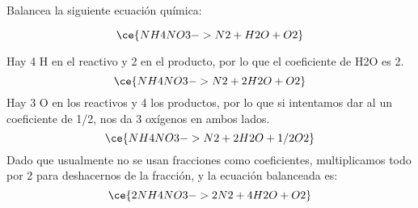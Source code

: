 Balancea la siguiente ecuación química:

\[
    \ce{NH4NO3 -> N2 + H2O + O2}
\]

\begin{solutionbox}{5cm}
    Hay 4 H en el reactivo y 2 en el producto, por lo que el coeficiente de H2O es 2.
    \[
        \ce{NH4NO3 -> N2 + 2H2O + O2}
    \]
    Hay 3 O en los reactivos y 4 los productos, por lo que si intentamos dar al  un coeficiente de 1/2, nos da 3 oxígenos en ambos lados.
    \[
        \ce{NH4NO3 -> N2 + 2H2O + 1/2O2}
    \]
    Dado que usualmente no se usan fracciones como coeficientes, multiplicamos todo por 2 para deshacernos de la fracción, y la ecuación balanceada es:
    \[
        \ce{2NH4NO3 -> 2N2 + 4H2O + O2}
    \]
\end{solutionbox}